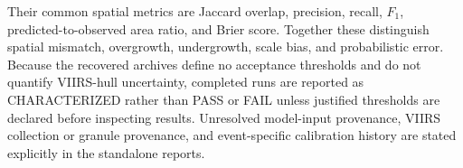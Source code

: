 \documentclass[12pt]{article}
\begin{document}
Their common spatial metrics are Jaccard overlap, precision, recall,
$F_1$, predicted-to-observed area ratio, and Brier score.  Together these
distinguish spatial mismatch, overgrowth, undergrowth, scale bias, and
probabilistic error.  Because the recovered archives define no acceptance
thresholds and do not quantify VIIRS-hull uncertainty, completed runs are
reported as CHARACTERIZED rather than PASS or FAIL unless justified thresholds
are declared before inspecting results.  Unresolved model-input provenance,
VIIRS collection or granule provenance, and event-specific calibration history
are stated explicitly in the standalone reports.


\end{document}

